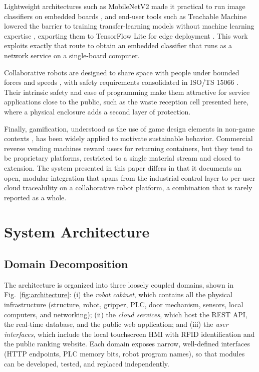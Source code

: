 \documentclass[conference]{IEEEtran}
\begin{document}
Lightweight architectures such as MobileNetV2 made it practical to run image classifiers on embedded boards \cite{b7}, and end-user tools such as Teachable Machine lowered the barrier to training transfer-learning models without machine learning expertise \cite{b8}, exporting them to TensorFlow Lite for edge deployment \cite{b9}. This work exploits exactly that route to obtain an embedded classifier that runs as a network service on a single-board computer.

Collaborative robots are designed to share space with people under bounded forces and speeds \cite{b10}, with safety requirements consolidated in ISO/TS 15066 \cite{b11}. Their intrinsic safety and ease of programming make them attractive for service applications close to the public, such as the waste reception cell presented here, where a physical enclosure adds a second layer of protection.

Finally, gamification, understood as the use of game design elements in non-game contexts \cite{b12}, has been widely applied to motivate sustainable behavior. Commercial reverse vending machines reward users for returning containers, but they tend to be proprietary platforms, restricted to a single material stream and closed to extension. The system presented in this paper differs in that it documents an open, modular integration that spans from the industrial control layer to per-user cloud traceability on a collaborative robot platform, a combination that is rarely reported as a whole.

\section{System Architecture}
\subsection{Domain Decomposition}
The architecture is organized into three loosely coupled domains, shown in Fig.~\ref{fig:architecture}: (i) the \emph{robot cabinet}, which contains all the physical infrastructure (structure, robot, gripper, PLC, door mechanism, sensors, local computers, and networking); (ii) the \emph{cloud services}, which host the REST API, the real-time database, and the public web application; and (iii) the \emph{user interfaces}, which include the local touchscreen HMI with RFID identification and the public ranking website. Each domain exposes narrow, well-defined interfaces (HTTP endpoints, PLC memory bits, robot program names), so that modules can be developed, tested, and replaced independently.
\end{document}
